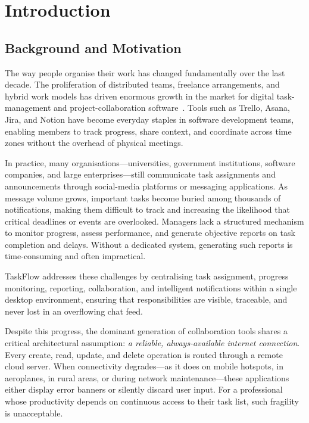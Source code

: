 \chapter{Introduction}\label{chap:intro}

\section{Background and Motivation}\label{sec:intro_background}

The way people organise their work has changed fundamentally over the last decade.
The proliferation of distributed teams, freelance arrangements, and hybrid work models
has driven enormous growth in the market for digital task-management and project-collaboration
software~\cite{allen2001gtd}.
Tools such as Trello, Asana, Jira, and Notion have become everyday staples in software
development teams, enabling members to track progress, share context, and coordinate
across time zones without the overhead of physical meetings.

In practice, many organisations---universities, government institutions, software companies, and large enterprises---still communicate task assignments and announcements through social-media platforms or messaging applications. As message volume grows, important tasks become buried among thousands of notifications, making them difficult to track and increasing the likelihood that critical deadlines or events are overlooked. Managers lack a structured mechanism to monitor progress, assess performance, and generate objective reports on task completion and delays. Without a dedicated system, generating such reports is time-consuming and often impractical.

TaskFlow addresses these challenges by centralising task assignment, progress monitoring, reporting, collaboration, and intelligent notifications within a single desktop environment, ensuring that responsibilities are visible, traceable, and never lost in an overflowing chat feed.

Despite this progress, the dominant generation of collaboration tools shares a critical
architectural assumption: \emph{a reliable, always-available internet connection}.
Every create, read, update, and delete operation is routed through a remote cloud server.
When connectivity degrades---as it does on mobile hotspots, in aeroplanes, in rural areas,
or during network maintenance---these applications either display error banners or silently
discard user input.
For a professional whose productivity depends on continuous access to their task list,
such fragility is unacceptable.

